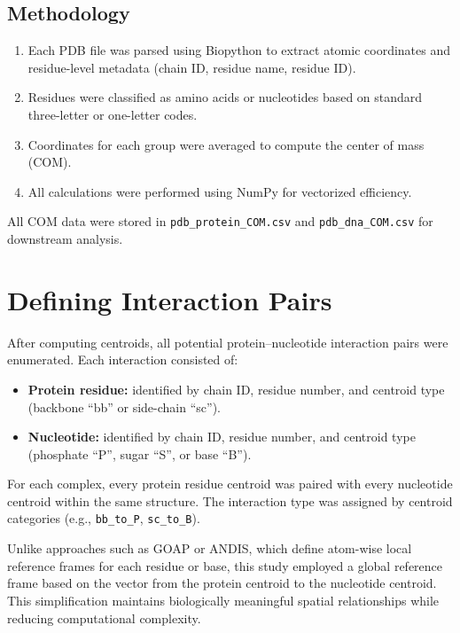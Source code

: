 \documentclass[12pt,a4paper]{report}
\begin{document}
\subsection*{Methodology}
\begin{enumerate}
    \item Each PDB file was parsed using Biopython to extract atomic coordinates and residue-level metadata (chain ID, residue name, residue ID).
    \item Residues were classified as amino acids or nucleotides based on standard three-letter or one-letter codes.
    \item Coordinates for each group were averaged to compute the center of mass (COM).
    \item All calculations were performed using NumPy for vectorized efficiency.
\end{enumerate}

All COM data were stored in \texttt{pdb\_protein\_COM.csv} and \texttt{pdb\_dna\_COM.csv} for downstream analysis.

\newpage
\section*{Defining Interaction Pairs}

After computing centroids, all potential protein--nucleotide interaction pairs were enumerated.  
Each interaction consisted of:
\begin{itemize}
    \item \textbf{Protein residue:} identified by chain ID, residue number, and centroid type (backbone ``bb'' or side-chain ``sc'').
    \item \textbf{Nucleotide:} identified by chain ID, residue number, and centroid type (phosphate ``P'', sugar ``S'', or base ``B'').
\end{itemize}

For each complex, every protein residue centroid was paired with every nucleotide centroid within the same structure. The interaction type was assigned by centroid categories (e.g., \texttt{bb\_to\_P}, \texttt{sc\_to\_B}).

Unlike approaches such as GOAP or ANDIS, which define atom-wise local reference frames for each residue or base, this study employed a global reference frame based on the vector from the protein centroid to the nucleotide centroid. This simplification maintains biologically meaningful spatial relationships while reducing computational complexity.
\end{document}
